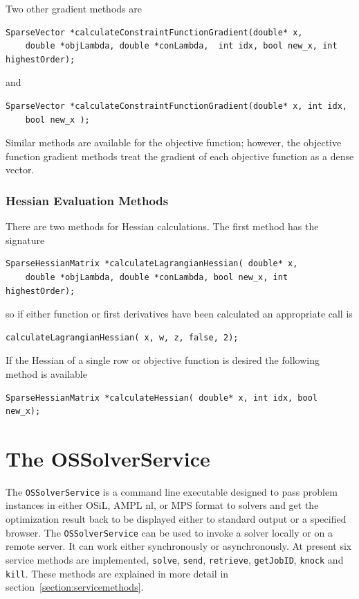 \documentclass[11pt]{article}
\renewcommand{\_}{{\char"5F}}
\renewcommand{\{}{{\char"7B}}
\renewcommand{\}}{{\char"7D}}
\renewcommand{\^}{{\char"0D}}
\renewcommand{\'}{{\char"0D}}
\begin{document}
\begin{enumerate}[Step 1:]
Two other gradient methods are
\begin{verbatim}
SparseVector *calculateConstraintFunctionGradient(double* x,
    double *objLambda, double *conLambda,  int idx, bool new_x, int highestOrder);
\end{verbatim}
and
\begin{verbatim}
SparseVector *calculateConstraintFunctionGradient(double* x, int idx,
    bool new_x );
\end{verbatim}

Similar methods are available for the objective function; however, the objective function gradient methods treat the gradient of each objective function as a dense vector.


\subsubsection{Hessian Evaluation Methods}

There are two methods for Hessian calculations.  The first method has the signature
\begin{verbatim}
SparseHessianMatrix *calculateLagrangianHessian( double* x,
    double *objLambda, double *conLambda, bool new_x, int highestOrder);
\end{verbatim}
so if either function or first derivatives have been calculated an appropriate call is
\begin{verbatim}
calculateLagrangianHessian( x, w, z, false, 2);
\end{verbatim}
If the Hessian of a single row or objective function is desired the following method is available
\begin{verbatim}
SparseHessianMatrix *calculateHessian( double* x, int idx, bool new_x);
\end{verbatim}

\section{The OSSolverService}\label{section:ossolverservice}

The {\tt OSSolverService} is a command line executable designed 
to pass problem instances in either  OSiL, AMPL nl, or MPS format
to solvers and get the optimization result back to be displayed either to standard output or a specified browser.  
The {\tt OSSolverService} can be used to invoke a solver locally or on a remote server. It can work either synchronously 
or asynchronously. At present six service methods are implemented, {\tt solve}, 
{\tt send}, {\tt retrieve}, 
{\tt getJobID}, {\tt knock} and {\tt kill}.
These methods are explained in more detail in section~\ref{section:servicemethods}.


\end{enumerate}
\end{document}
